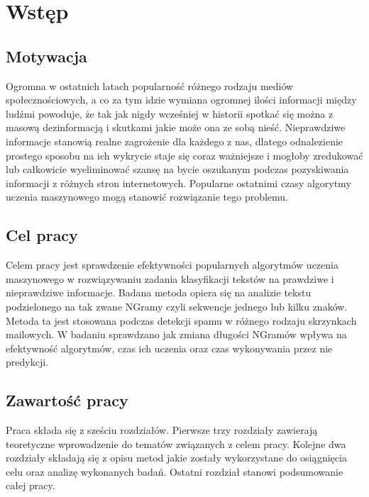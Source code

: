 \chapter*{Wstęp}
\section*{Motywacja}
Ogromna w ostatnich latach popularność różnego rodzaju mediów społecznościowych, a co za tym 
idzie wymiana ogromnej ilości informacji między ludźmi powoduje, że tak jak nigdy wcześniej 
w historii spotkać się można z masową dezinformacją i skutkami jakie może ona ze sobą nieść.
Nieprawdziwe informacje stanowią realne zagrożenie dla każdego z nas, dlatego odnalezienie 
prostego sposobu na ich wykrycie staje się coraz ważniejsze i mogłoby 
zredukować lub całkowicie wyeliminować szansę na bycie oszukanym podczas pozyskiwania
informacji z różnych stron internetowych. Popularne ostatnimi czasy algorytmy uczenia 
maszynowego mogą stanowić rozwiązanie tego problemu.
\section*{Cel pracy}
Celem pracy jest sprawdzenie efektywności popularnych algorytmów uczenia maszynowego w rozwiązywaniu 
zadania klasyfikacji tekstów na prawdziwe i nieprawdziwe informacje. Badana metoda opiera 
się na analizie tekstu podzielonego na tak zwane NGramy czyli sekwencje jednego lub kilku znaków.
Metoda ta jest stosowana podczas detekcji spamu w różnego rodzaju skrzynkach mailowych.
W badaniu sprawdzano jak zmiana długości NGramów wpływa na efektywność algorytmów, czas ich 
uczenia oraz czas wykonywania przez nie predykcji. 
\section*{Zawartość pracy}
Praca składa się z sześciu rozdziałów. Pierwsze trzy rozdziały zawierają teoretyczne wprowadzenie 
do tematów związanych z celem pracy. Kolejne dwa rozdziały składają się z opisu metod jakie 
zostały wykorzystane do osiągnięcia celu oraz analizę wykonanych badań. Ostatni rozdział 
stanowi podsumowanie całej pracy.

